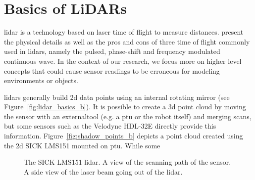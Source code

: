 \section{Basics of LiDARs}
\label{sec:chap_lidar_basics}

\gls*{lidar} is a technology based on laser time of flight to measure distances. \citet{lidar_basics} present the physical details as well as the pros and cons of three time of flight commonly used in \gls*{lidar}s, namely the pulsed, phase-shift and frequency modulated continuous wave. In the context of our research, we focus more on higher level concepts that could cause sensor readings to be erroneous for modeling environments or objects. 

\gls*{lidar}s generally build \gls*{2d} data points using an internal rotating mirror (see Figure~\ref{fig:lidar_basics_b}). It is possible to create a \gls*{3d} point cloud by moving the sensor with an externaltool (e.g. a \gls*{ptu} or the robot itself) and merging scans, but some sensors such as the Velodyne HDL-32E directly provide this information. Figure~\ref{fig:shadow_points_b} depicts a point cloud created using the \gls*{2d} SICK LMS151 mounted on \gls*{ptu}. While some

\begin{figure}[h]
    \centering
    \caption{\protect{} The SICK LMS151 \gls*{lidar}. \protect{} A view of the scanning path of the sensor. \protect{} A side view of the laser beam going out of the \gls*{lidar}.}
    \label{fig:lidar_basics}
\end{figure}


